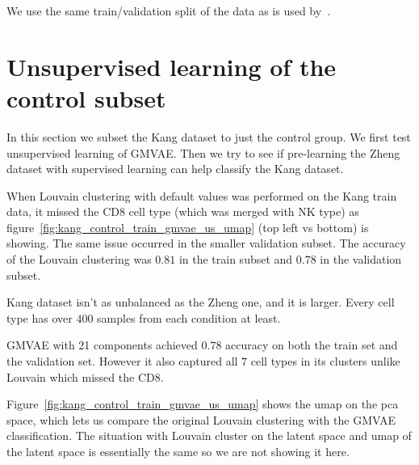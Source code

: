 \documentclass[11pt, a4paper]{report}
\theoremstyle{plain}
\theoremstyle{definition}
\theoremstyle{remark}
\begin{document}
We use the same train/validation split of the data as is used
by~\cite{lotfollahi2019scgen}.

\section{Unsupervised learning of the control subset}

In this section we subset the Kang dataset to just the control group. We first
test unsupervised learning of GMVAE. Then we try to see if pre-learning the
Zheng dataset with supervised learning can help classify the Kang dataset.

When Louvain clustering with default values was performed on the Kang train data,
it missed the CD8 cell type (which was merged with NK type) as
figure~\ref{fig:kang_control_train_gmvae_us_umap} (top left vs bottom) is showing.
The same issue occurred in
the smaller validation subset.
The accuracy of the Louvain clustering was $0.81$ in the train subset and
$0.78$ in the validation subset.


Kang dataset isn't as unbalanced as the Zheng one, and it is larger.
Every cell type has over $400$ samples from each condition at least.

GMVAE with 21 components achieved $0.78$ accuracy on both the train set and the
validation set. However it also captured all $7$ cell types in its clusters 
unlike Louvain which missed the CD8.

Figure~\ref{fig:kang_control_train_gmvae_us_umap} shows the umap on the pca
space, which lets us compare the original Louvain clustering with the GMVAE
classification. The situation with Louvain cluster on the latent space and umap
of the latent space is essentially the same so we are not showing it here. 
\end{document}
